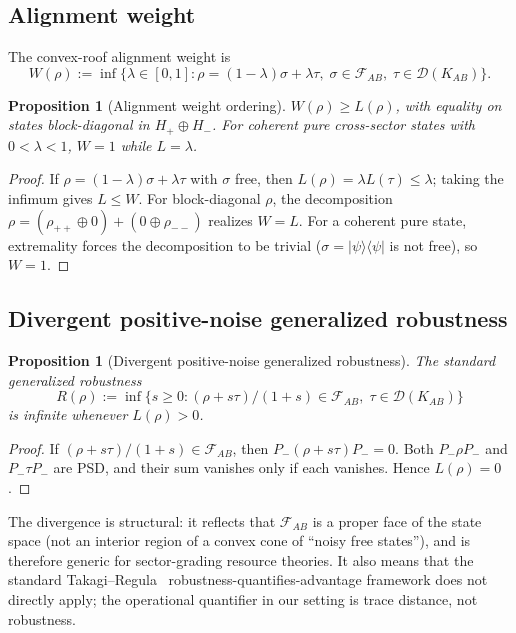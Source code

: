 \documentclass[a4paper,onecolumn,noarxiv]{quantumarticle}
\theoremstyle{plain}
\newtheorem{proposition}[theorem]{Proposition}
\theoremstyle{definition}
\theoremstyle{remark}
\newcommand{\KAB}{K_{AB}}
\newcommand{\Pminus}{P_{-}}
\newcommand{\Hplus}{H_{+}}
\newcommand{\Hminus}{H_{-}}
\newcommand{\FAB}{\mathcal{F}_{AB}}
\newcommand{\Lleak}{L}
\begin{document}
\subsection{Alignment weight}

The convex-roof alignment weight is
\begin{equation}
  W(\rho) := \inf\{\lambda\in[0,1] :
  \rho=(1-\lambda)\sigma+\lambda\tau,\;\sigma\in\FAB,\;\tau\in\mathcal{D}(\KAB)\}.
\end{equation}

\begin{proposition}[Alignment weight ordering]
\label{prop:weight}
$W(\rho)\ge\Lleak(\rho)$, with equality on states block-diagonal in $\Hplus\oplus\Hminus$.
For coherent pure cross-sector states with $0<\lambda<1$, $W=1$ while
$\Lleak=\lambda$.
\end{proposition}

\begin{proof}
If $\rho=(1-\lambda)\sigma+\lambda\tau$ with $\sigma$ free, then
$\Lleak(\rho)=\lambda\Lleak(\tau)\le\lambda$; taking the infimum gives $\Lleak\le W$.
For block-diagonal $\rho$, the decomposition $\rho=(\rho_{++}\oplus 0)+(0\oplus\rho_{--})$
realizes $W=\Lleak$. For a coherent pure state, extremality forces the decomposition
to be trivial ($\sigma=|\psi\rangle\langle\psi|$ is not free), so $W=1$.
\end{proof}

\subsection{Divergent positive-noise generalized robustness}

\begin{proposition}[Divergent positive-noise generalized robustness]
\label{prop:robustness}
The standard generalized robustness
\begin{equation}
  R(\rho) := \inf\{s\ge 0 : (\rho+s\tau)/(1+s)\in\FAB,\;\tau\in\mathcal{D}(\KAB)\}
\end{equation}
is infinite whenever $\Lleak(\rho)>0$.
\end{proposition}

\begin{proof}
If $(\rho+s\tau)/(1+s)\in\FAB$, then $\Pminus(\rho+s\tau)\Pminus=0$. Both
$\Pminus\rho\Pminus$ and $\Pminus\tau\Pminus$ are PSD, and their sum vanishes only if
each vanishes. Hence $\Lleak(\rho)=0$.
\end{proof}

The divergence is structural: it reflects that $\FAB$ is a proper face of the state
space (not an interior region of a convex cone of ``noisy free states''), and is
therefore generic for sector-grading resource theories. It also means that the
standard Takagi--Regula~\cite{TakagiRegula2019} robustness-quantifies-advantage
framework does not directly apply; the operational quantifier in our setting is trace
distance, not robustness.
\end{document}
